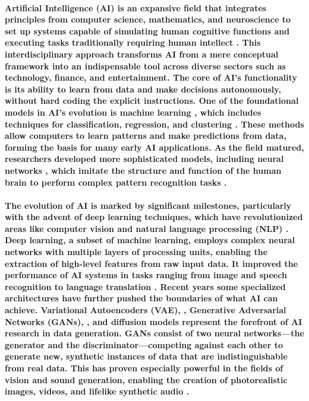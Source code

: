 \documentclass[11pt,a4paper,oneside]{report}
\begin{document}
\paragraph{Artificial Intelligence (AI) is an expansive field that integrates principles from computer science, mathematics, and neuroscience to set up systems capable of simulating human cognitive functions and executing tasks traditionally requiring human intellect \cite{russell2010artificial}. 
This interdisciplinary approach transforms AI from a mere conceptual framework into an indispensable tool across diverse sectors such as technology, finance, and entertainment. 
The core of AI's functionality is its ability to learn from data and make decisions autonomously, without hard coding the explicit instructions. 
One of the foundational models in AI's evolution is machine learning \cite{jordan2015machine}, which includes techniques for classification, regression, and clustering \cite{huang2022large}. 
These methods allow computers to learn patterns and make predictions from data, forming the basis for many early AI applications. 
As the field matured, researchers developed more sophisticated models, including neural networks \cite{abiodun2018state}, which imitate the structure and function of the human brain to perform complex pattern recognition tasks \cite{schmidhuber2015deep}.
}
\paragraph{The evolution of AI is marked by significant milestones, particularly with the advent of deep learning \cite{lecun2015deep} techniques, which have revolutionized areas like computer vision \cite{voulodimos2018deep} and natural language processing (NLP) \cite{chowdhary2020natural}. 
Deep learning, a subset of machine learning, employs complex neural networks with multiple layers of processing units, enabling the extraction of high-level features from raw input data. 
It improved the performance of AI systems in tasks ranging from image and speech recognition to language translation \cite{goodfellow2016deep}.
Recent years some specialized architectures have further pushed the boundaries of what AI can achieve. 
Variational Autoencoders (VAE), \cite{rezende2014stochastic} \cite{kingma2013auto}, Generative Adversarial Networks (GANs), \cite{goodfellow2014generative} \cite{vondrick2016generating} \cite{tulyakov2018mocogan} \cite{clark2019adversarial} \cite{brooks2022generating}, and diffusion models \cite{rombach2022high} \cite{ho2022imagen} \cite{blattmann2023align} \cite{gupta2023photorealistic} represent the forefront of AI research in data generation. 
GANs consist of two neural networks—the generator and the discriminator—competing against each other to generate new, synthetic instances of data that are indistinguishable from real data. 
This has proven especially powerful in the fields of vision and sound generation, enabling the creation of photorealistic images, videos, and lifelike synthetic audio \cite{granot2022drop}.
}
\end{document}
